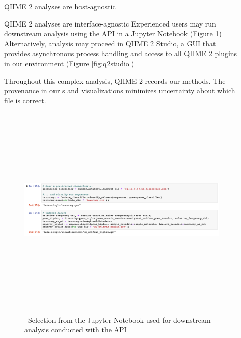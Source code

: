 \documentclass[final]{beamer}
\newlength{\sepwidth}
\newlength{\colwidth}
\newcommand{\separatorcolumn}{\begin{column}{\sepwidth}\end{column}}
\begin{document}
\begin{frame}[t]
\begin{columns}[t]
\begin{column}{\colwidth}
\begin{block}{QIIME 2 analyses are host-agnostic}
  \end{block}

  \begin{block}{QIIME 2 analyses are interface-agnostic}
    Experienced users may run downstream analysis using the  API in
    a Jupyter Notebook \cite{PER-GRA:2007} (Figure \ref{fig:taxabar})
    Alternatively, analysis may proceed in QIIME 2 Studio, a GUI
    that provides asynchronous process handling and access to all
    QIIME 2 plugins in our environment (Figure \ref{fig:q2studio})

    \begin{tcolorbox}
    [width=\textwidth, colframe=blue]
    {Throughout this complex analysis, QIIME 2 records our methods.
    The provenance in our s and visualizations minimizes
    uncertainty about which file is correct.}
    \end{tcolorbox}

    \begin{figure}[tph!]
      {\includegraphics[height=10cm]{assets/jupyter}}
      \caption{\, Selection from the Jupyter Notebook used for downstream analysis conducted with the  API}
      \label{fig:taxabar}
    \end{figure}

  \end{block}

\end{column}

\separatorcolumn

\begin{column}{\colwidth}


\end{column}
\end{columns}
\end{frame}
\end{document}
